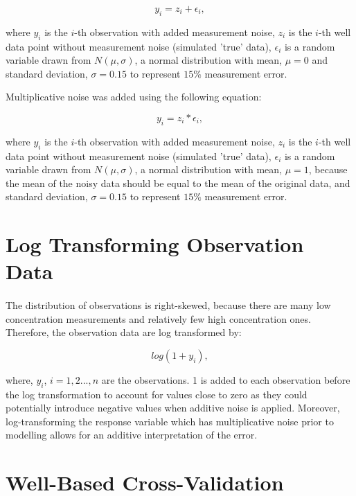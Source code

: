 \documentclass{article}
\begin{document}
\begin{equation}
    y_i = z_i + \epsilon_i,
\end{equation}

where $y_i$ is the $i$-th observation with added measurement noise, $z_i$ is the $i$-th well data point without measurement noise (simulated 'true' data), $\epsilon_i$ is a random variable drawn from $N(\mu,\sigma)$, a normal distribution with mean, $\mu = 0$ and standard deviation, $\sigma = 0.15$ to represent $15\%$ measurement error. 

Multiplicative noise was added using the following equation:

\begin{equation}
    y_i = z_i * \epsilon_i,
\end{equation}

where $y_i$ is the $i$-th observation with added measurement noise, $z_i$ is the $i$-th well data point without measurement noise (simulated 'true' data), $\epsilon_i$ is a random variable drawn from $N(\mu,\sigma)$, a normal distribution with mean, $\mu = 1$, because the mean of the noisy data should be equal to the mean of the original data, and standard deviation, $\sigma = 0.15$ to represent $15\%$ measurement error.

\section{Log Transforming Observation Data}
\paragraph{}

The distribution of observations is right-skewed, because there are many low concentration measurements and relatively few high concentration ones. Therefore, the observation data are log transformed by: 

\begin{equation}
    log(1+y_i),
\end{equation}

where, $y_i$, $i = 1, 2..., n$ are the observations. 1 is added to each observation before the log transformation to account for values close to zero as they could potentially introduce negative values when additive noise is applied. Moreover, log-transforming the response variable which has multiplicative noise prior to modelling allows for an additive interpretation of the error.

\section{Well-Based Cross-Validation}
\end{document}
